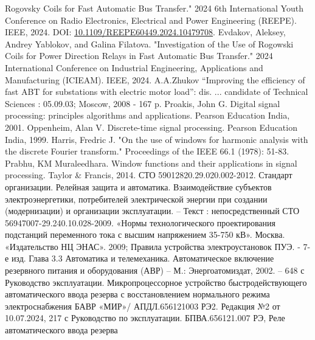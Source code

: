 Rogovsky Coils for Fast Automatic Bus Transfer." 2024 6th International Youth Conference
on Radio Electronics, Electrical and Power Engineering (REEPE). IEEE, 2024. DOI:
\href{https://doi.org/10.1109/REEPE60449.2024.10479708}{10.1109/REEPE60449.2024.10479708}.
Evdakov, Aleksey, Andrey Yablokov, and Galina Filatova. "Investigation of the Use of
Rogowski Coils for Power Direction Relays in Fast Automatic Bus Transfer." 2024
International Conference on Industrial Engineering, Applications and Manufacturing
(ICIEAM). IEEE, 2024.
A.A.Zhukov “Improving the efficiency of fast ABT for substations with electric motor
load”: dis. ... candidate of Technical Sciences : 05.09.03; Moscow, 2008 - 167 p.
Proakis, John G. Digital signal processing: principles algorithms and applications.
Pearson Education India, 2001.
Oppenheim, Alan V. Discrete-time signal processing. Pearson Education India, 1999.
Harris, Fredric J. "On the use of windows for harmonic analysis with the discrete Fourier
transform." Proceedings of the IEEE 66.1 (1978): 51-83.
Prabhu, KM Muraleedhara. Window functions and their applications in signal processing.
Taylor \& Francis, 2014.
СТО 59012820.29.020.002-2012. Стандарт организации. Релейная защита и автоматика.
Взаимодействие субъектов электроэнергетики, потребителей электрической энергии при
создании (модернизации) и организации эксплуатации. – Текст : непосредственный
СТО 56947007-29.240.10.028-2009. «Нормы технологического проектирования подстанций
переменного тока с высшим напряжением 35-750 кВ». Москва. «Издательство НЦ ЭНАС». 2009;
Правила устройства электроустановок ПУЭ. - 7-е изд. Глава 3.3 Автоматика и телемеханика.
Автоматическое включение резервного питания и оборудования (АВР) – М.: Энергоатомиздат,
2002. – 648 с
Руководство эксплуатации. Микропроцессорное устройство быстродействующего автоматического
ввода резерва с восстановлением нормального режима электроснабжения БАВР «МИР»/
АПДЛ.656121003 РЭ2. Редакция №2 от 10.07.2024, 217 с
Руководство по эксплуатации. БПВА.656121.007 РЭ, Реле автоматического ввода резерва
